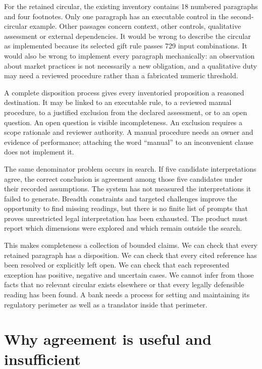 For the retained circular, the existing inventory contains 18 numbered
paragraphs and four footnotes. Only one paragraph has an executable control in
the second-circular example. Other passages concern context, other controls,
qualitative assessment or external dependencies. It would be wrong to describe
the circular as implemented because its selected gift rule passes 729 input
combinations. It would also be wrong to implement every paragraph mechanically:
an observation about market practices is not necessarily a new obligation, and a
qualitative duty may need a reviewed procedure rather than a fabricated numeric
threshold.

A complete disposition process gives every inventoried proposition a reasoned
destination. It may be linked to an executable rule, to a reviewed manual
procedure, to a justified exclusion from the declared assessment, or to an open
question. An open question is visible incompleteness. An exclusion requires a
scope rationale and reviewer authority. A manual procedure needs an owner and
evidence of performance; attaching the word ``manual'' to an inconvenient clause
does not implement it.

The same denominator problem occurs in search. If five candidate interpretations
agree, the correct conclusion is agreement among those five candidates under
their recorded assumptions. The system has not measured the interpretations it
failed to generate. Breadth constraints and targeted challenges improve the
opportunity to find missing readings, but there is no finite list of prompts
that proves unrestricted legal interpretation has been exhausted. The product
must report which dimensions were explored and which remain outside the search.

This makes completeness a collection of bounded claims. We can check that every
retained paragraph has a disposition. We can check that every cited reference has
been resolved or explicitly left open. We can check that each represented
exception has positive, negative and uncertain cases. We cannot infer from those
facts that no relevant circular exists elsewhere or that every legally
defensible reading has been found. A bank needs a process for setting and
maintaining its regulatory perimeter as well as a translator inside that perimeter.

\section{Why agreement is useful and insufficient}
\label{merge:M01:04}

